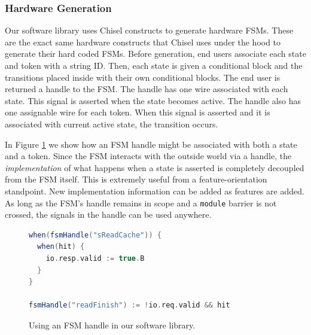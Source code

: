\documentclass[conference]{IEEEtran}
\begin{document}
\subsubsection{Hardware Generation}
Our software library uses Chisel constructs to generate hardware FSMs. These are the exact same hardware constructs that Chisel uses under the hood to generate their hard coded FSMs. Before generation, end users associate each state and token with a string ID. Then, each state is given a conditional block and the transitions placed inside with their own conditional blocks. The end user is returned a handle to the FSM. The handle has one wire associated with each state. This signal is asserted when the state becomes active. The handle also has one assignable wire for each token. When this signal is asserted and it is associated with current active state, the transition occurs.

In Figure \ref{fig:handle} we show how an FSM handle might be associated with both a state and a token. Since the FSM interacts with the outside world via a handle, the \emph{implementation} of what happens when a state is asserted is completely decoupled from the FSM itself. This is extremely useful from a feature-orientation standpoint. New implementation information can be added as features are added. As long as the FSM's handle remains in scope and a \texttt{module} barrier is not crossed, the signals in the handle can be used anywhere. 

\begin{figure}[ht]
    \centering
    \begin{lstlisting}[language = Scala]
when(fsmHandle("sReadCache")) {
  when(hit) {
    io.resp.valid := true.B
  }
}

fsmHandle("readFinish") := !io.req.valid && hit
    \end{lstlisting}
    \caption{Using an FSM handle in our software library.}
    \label{fig:handle}
\end{figure}
\end{document}
